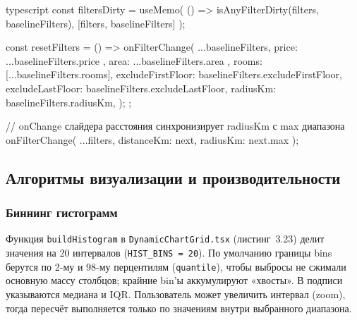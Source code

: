 \begin{singleminted}{typescript}
const filtersDirty = useMemo(
    () => isAnyFilterDirty(filters, baselineFilters),
    [filters, baselineFilters]
);

const resetFilters = () => {
    onFilterChange({
        ...baselineFilters,
        price: { ...baselineFilters.price },
        area: { ...baselineFilters.area },
        rooms: [...baselineFilters.rooms],
        excludeFirstFloor: baselineFilters.excludeFirstFloor,
        excludeLastFloor: baselineFilters.excludeLastFloor,
        radiusKm: baselineFilters.radiusKm,
    });
};

// onChange слайдера расстояния синхронизирует radiusKm с max диапазона
onFilterChange({ ...filters, distanceKm: next, radiusKm: next.max });
\end{singleminted}
\label{lst:filter-panel}

\subsection{Алгоритмы визуализации и производительности}

\subsubsection{Биннинг гистограмм}

Функция \texttt{buildHistogram} в \texttt{DynamicChartGrid.tsx} (листинг~3.23) делит значения на 20 интервалов (\texttt{HIST\_BINS = 20}). По умолчанию границы bins берутся по 2-му и 98-му перцентилям (\texttt{quantile}), чтобы выбросы не сжимали основную массу столбцов; крайние bin'ы аккумулируют «хвосты». В подписи указываются медиана и IQR. Пользователь может увеличить интервал (zoom), тогда пересчёт выполняется только по значениям внутри выбранного диапазона.

